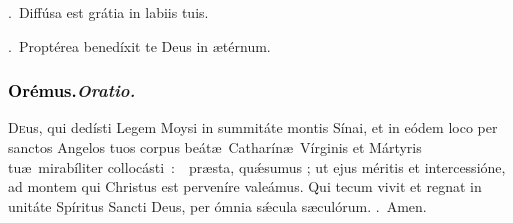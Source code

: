 \documentclass[12pt]{article} %
\def\capitulumSpace{\hspace{20 mm}}
\let\oldgresixstar\gresixstar
\renewcommand{\gresixstar}{\textcolor{benred8}{\oldgresixstar}}
\let\oldVbar\Vbar
\renewcommand{\Vbar}{\textcolor{benred8}{\oldVbar .}}
\let\oldRbar\Rbar
\renewcommand{\Rbar}{\textcolor{benred8}{\oldRbar .}}
\newenvironment{response}{\leftskip 0in \setlength{\parindent}{0in}}{\vspace{2 mm}}
\begin{document}



\begin{response}
\Vbar\ Diff\'{u}sa est gr\'{a}tia in labiis tuis.

\Rbar\ Propt\'{e}rea bened\'{i}xit te Deus in \ae t\'{e}rnum.

\end{response}

\subsubsection*{\textcolor{black}{Or\'{e}mus.}\capitulumSpace \emph{Oratio.}}

\begin{response}\lettrine{D}{e}us, qui ded\'{i}sti Legem Moysi in summit\'{a}te montis S\'{i}nai, et in e\'{o}dem loco per sanctos Angelos tuos corpus be\'{a}t\ae\ Cathar\'{i}n\ae\ V\'{i}rginis et M\'{a}rtyris tu\ae\ mirab\'{i}liter colloc\'{a}sti~:~\gresixstar\ pr\ae sta, qu\'{\ae}sumus ; ut ejus m\'{e}ritis et intercessi\'{o}ne, ad montem qui Christus est perven\'{i}re vale\'{a}mus. Qui tecum vivit et regnat in unit\'{a}te Sp\'{i}ritus Sancti Deus, per \'{o}mnia s\'{\ae}cula s\ae cul\'{o}rum. \Rbar\ Amen.

\end{response}




\end{document}
